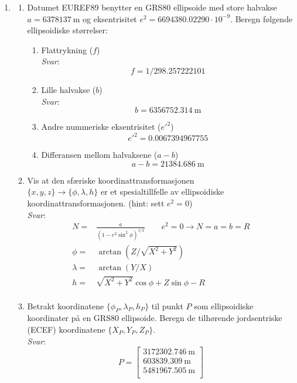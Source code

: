\documentclass[a4paper, norsk, 11pt, twoside]{article}
\begin{document}
\begin{enumerate}
\textit{Ellipsoidiske koordinater}
\item
  \begin{enumerate}
  \item Datumet EUREF89 benytter en GRS80 ellipsoide med store halvakse $a=\SI{6378137}{\meter}$ og eksentrisitet $e^{2}=6694380.02290 \cdot 10^{-9}$. Beregn følgende ellipsoidiske størrelser:
  \begin{enumerate}
    \item Flattrykning ($f$)\\
    \textit{Svar}:
    \begin{equation*}
      f=1/298.257222101
    \end{equation*}
    \item Lille halvakse ($b$)\\
    \textit{Svar}:
    \begin{equation*}
      b=\SI{6356752.314}{\meter}
    \end{equation*}
    \item Andre nummeriske eksentrisitet ($e'^{2}$)\\
     \begin{equation*}
      e'^{2}=0.0067394967755
    \end{equation*}
    \item Differansen mellom halvaksene ($a-b$)\\
    \begin{equation*}      
      a-b=\SI{21384.686}{\meter}
    \end{equation*}
  \end{enumerate}
  \item Vis at den sfæriske koordinattransformasjonen\\ $\{x,y,z\} \rightarrow \{\phi,\lambda,h\}$ er et spesialtillfelle av ellipsoidiske koordinattransformasjonen. (hint: sett $e^{2}=0$)\\
  \textit{Svar}:
  \begin{align*}
    N=&\frac{a}{(1-e^{2}\sin^{2} \phi)^{1/2}} \qquad e^{2}=0 \rightarrow N=a=b=R\\
    \phi=&\arctan(Z/\sqrt{X^{2}+Y^{2}})\\
    \lambda=&\arctan(Y/X)\\
    h=&\sqrt{X^{2}+Y^{2}} \cos \phi + Z \sin \phi -R\\
  \end{align*}
  \item Betrakt koordinatene $\{\phi_{P},\lambda_{P},h_{P}\}$ til punkt $P$ som ellipsoidiske koordinater på en GRS80 ellipsoide. Beregn de tilhørende jordsentriske (ECEF) koordinatene $\{X_{P},Y_{P},Z_{P}\}$.\\
  \textit{Svar}:
  \begin{equation*}
  P=
  \begin{bmatrix}
    \SI{3172302.746}{\meter}\\
    \SI{603839.309}{\meter}\\
    \SI{5481967.505}{\meter}\\
  \end{bmatrix}
  \end{equation*}    
  

\end{enumerate}
\end{enumerate}
\end{document}
